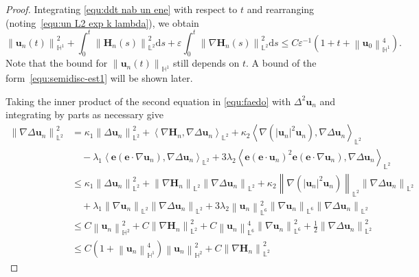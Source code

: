 \documentclass[11pt, reqno]{amsart}
\theoremstyle{definition}
\numberwithin{equation}{section}
\newcommand{\bff}{\boldsymbol}
\newcommand{\bb}{\mathbb}
\newcommand{\ds}{\mathrm{d}s}
\newcommand{\norm}[2]{\left\|{#1}\right\|_{#2}}
\newcommand{\inpro}[2]{\left\langle#1,#2\right\rangle}
\begin{document}
\begin{proof}
    Integrating \eqref{equ:ddt nab un ene} with respect to $t$ and rearranging (noting~\eqref{equ:un L2 exp k lambda}), we obtain 
    \begin{equation}\label{equ:lin H1}
        \norm{\bff{u}_n(t)}{\bb{H}^1}^2 
		+
		\int_0^t \norm{\bff{H}_n(s)}{\bb{L}^2}^2 \ds
		+
		\varepsilon \int_0^t \norm{\nabla \bff{H}_n(s)}{\bb{L}^2}^2 \ds
        \leq 
        C\varepsilon^{-1} \left(1+t+\norm{\bff{u}_0}{\bb{H}^1}^4 \right).
    \end{equation}
    Note that the bound for $\norm{\bff{u}_n(t)}{\bb{H}^1}$ still depends on $t$. A bound of the form~\eqref{equ:semidisc-est1} will be shown later.
    
	Taking the inner product of the second equation in \eqref{equ:faedo} with $\Delta^2 \bff{u}_n$ and integrating by parts as necessary give
	\begin{align}\label{equ:nab Delta un int L2}
		\nonumber
		\norm{\nabla \Delta \bff{u}_n}{\bb{L}^2}^2
		&=
		\kappa_1 \norm{\Delta \bff{u}_n}{\bb{L}^2}^2
		+
		\inpro{\nabla \bff{H}_n}{\nabla \Delta \bff{u}_n}_{\bb{L}^2}
		+
		\kappa_2 \inpro{\nabla(|\bff{u}_n|^2 \bff{u}_n)}{\nabla \Delta \bff{u}_n}_{\bb{L}^2}
        \nonumber \\
        &\quad
		-
		\lambda_1 \inpro{\bff{e}(\bff{e}\cdot \nabla\bff{u}_n)}{\nabla\Delta \bff{u}_n}_{\bb{L}^2}
        +
        3\lambda_2 \inpro{\bff{e}(\bff{e}\cdot \bff{u}_n)^2 \bff{e} (\bff{e}\cdot \nabla \bff{u}_n)}{\nabla \Delta \bff{u}_n}_{\bb{L}^2}
		\nonumber \\
		&\leq
		\kappa_1 \norm{\Delta \bff{u}_n}{\bb{L}^2}^2
		+
		\norm{\nabla \bff{H}_n}{\bb{L}^2} \norm{\nabla \Delta \bff{u}_n}{\bb{L}^2}
		+
		\kappa_2 \norm{\nabla(|\bff{u}_n|^2 \bff{u}_n)}{\bb{L}^2} \norm{\nabla \Delta \bff{u}_n}{\bb{L}^2}
        \nonumber \\
        &\quad
		+
		\lambda_1 \norm{\nabla\bff{u}_n}{\bb{L}^2} \norm{\nabla\Delta \bff{u}_n}{\bb{L}^2}
        +
        3\lambda_2 \norm{\bff{u}_n}{\bb{L}^6}^2 \norm{\nabla \bff{u}_n}{\bb{L}^6} \norm{\nabla \Delta \bff{u}_n}{\bb{L}^2}
		\nonumber \\
		&\leq
		C\norm{\bff{u}_n}{\bb{H}^2}^2
		+
		C \norm{\nabla \bff{H}_n}{\bb{L}^2}^2
		+
		C \norm{\bff{u}_n}{\bb{L}^6}^4 \norm{\nabla \bff{u}_n}{\bb{L}^6}^2
		+
		\frac{1}{2} \norm{\nabla \Delta \bff{u}_n}{\bb{L}^2}^2
		\nonumber \\
		&\leq
		C \left(1 + \norm{\bff{u}_n}{\bb{H}^1}^4 \right) \norm{\bff{u}_n}{\bb{H}^2}^2
		+
		C \norm{\nabla \bff{H}_n}{\bb{L}^2}^2

\end{align}
\end{proof}
\end{document}
